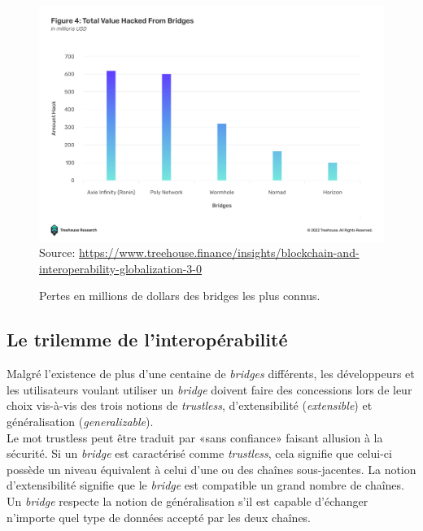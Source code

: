 \begin{figure}[h!]
    \centering
\includegraphics[scale=0.30]{centralisation/imagesBridges/GraphLossesBridges.png}
    {\scriptsize
            Source: \url{https://www.treehouse.finance/insights/blockchain-and-interoperability-globalization-3-0}}
    \caption{Pertes en millions de dollars des bridges les plus connus.}
    \label{fig:GraphBridges}
\end{figure}

\subsection{Le trilemme de l’interopérabilité}

Malgré l’existence de plus d’une centaine de \textit{bridges} différents, les développeurs et les utilisateurs voulant utiliser un \textit{bridge} doivent faire des concessions lors de leur choix vis-à-vis des trois notions de \textit{trustless}, d’extensibilité (\textit{extensible}) et généralisation (\textit{generalizable}).\\

Le mot trustless peut être traduit par «sans confiance» faisant allusion à la sécurité. Si un \textit{bridge} est caractérisé comme \textit{trustless}, cela signifie que celui-ci possède un niveau équivalent à celui d’une ou des chaînes sous-jacentes.  La notion  d’extensibilité signifie que le \textit{bridge} est compatible un grand nombre de chaînes.
Un \textit{bridge} respecte la notion de généralisation s’il est capable d'échanger n’importe quel type de données accepté par les deux chaînes.\\

